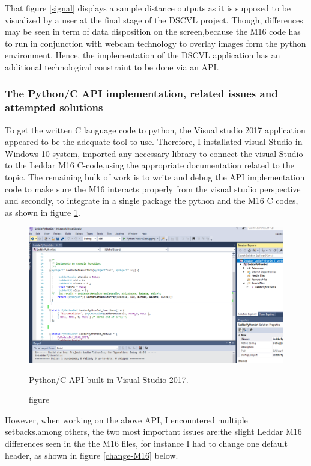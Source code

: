 \documentclass[onecolumn, draftclsnofoot,10pt, compsoc]{IEEEtran}
\begin{document}
\begin{singlespace}
That figure \ref{signal} displays a sample distance outputs as it is supposed to be visualized by a user at the final stage of the DSCVL project. Though, differences may be seen in term of data disposition on the screen,because the M16 code has to run in conjunction with webcam technology to overlay images form the python environment. Hence, the implementation of the DSCVL application has an additional technological constraint to be done via an API.
		
		\subsubsection{ The Python/C API implementation, related issues and attempted solutions}
		
To get the written C language code to python, the Visual studio 2017 application appeared to be the adequate tool to use. Therefore, I installated  visual Studio in Windows 10 system, imported any necessary library to connect the visual Studio  to the Leddar M16 C-code,using the appropriate \cite{Microsoft} documentation related to the topic. 
The remaining bulk of work is  to write and debug the API implementation code to make sure the M16 interacts properly from the visual studio perspective and secondly, to integrate in a single package the python and the M16 C codes, as shown in figure \ref{C-api}.

 \begin{figure}[H]
			\includegraphics[scale=0.5]{images/C-api.PNG}
			\caption{figure}{Python/C API built in Visual Studio 2017.}
			\label{C-api}
		\end{figure}
		
However, when working on the  above API, I encountered multiple setbacks.among others, the two most important issues are:the slight Leddar M16  differences seen in the the M16 files, for instance I had to change one default header, as shown in figure \ref{change-M16} below.


\end{singlespace}
\end{document}
